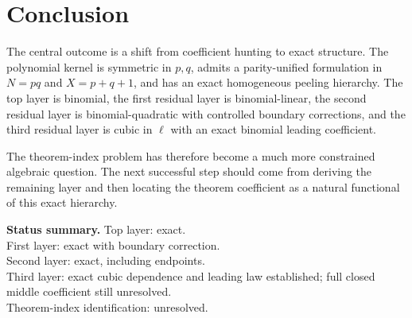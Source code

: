 \documentclass[11pt]{article}
\theoremstyle{remark}
\begin{document}
\section{Conclusion}

The central outcome is a shift from coefficient hunting to exact structure.
The polynomial kernel is symmetric in \(p,q\), admits a parity-unified formulation in
\(N=pq\) and \(X=p+q+1\), and has an exact homogeneous peeling hierarchy.  The top
layer is binomial, the first residual layer is binomial-linear, the second residual
layer is binomial-quadratic with controlled boundary corrections, and the third
residual layer is cubic in \(\ell\) with an exact binomial leading coefficient.

The theorem-index problem has therefore become a much more constrained algebraic
question.  The next successful step should come from deriving the remaining layer
and then locating the theorem coefficient as a natural functional of this exact
hierarchy.

\bigskip
\noindent\textbf{Status summary.}
Top layer: exact.\\
First layer: exact with boundary correction.\\
Second layer: exact, including endpoints.\\
Third layer: exact cubic dependence and leading law established; full closed middle
coefficient still unresolved.\\
Theorem-index identification: unresolved.
\end{document}
